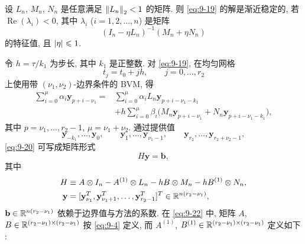 \begin{lemma}
\label{lem:9-3}
设 $L_n$, $M_n$, $N_n$ 是任意满足 $\left\|L_n\right\|_2<1$ 的矩阵. 则 \eqref{eq:9-19} 的解是渐近稳定的, 若 $\operatorname{Re}(\lambda_i)<0$, 其中 $\lambda_i$ ($i=1,2,\ldots,n$) 是矩阵
\[
  (I_n-\eta L_n)^{-1}(M_n+\eta N_n)
\]
的特征值, 且 $\left|\eta\right|\leqslant1$.
\end{lemma}

令 $h=\tau/k_1$ 为步长, 其中 $k_1$ 是正整数. 对 \eqref{eq:9-19}, 在均匀网格
\[
  t_j=t_0+jh,\qquad j=0,\ldots,r_2
\]
上使用带 $(\nu_1,\nu_2)$-边界条件的 BVM, 得
\begin{equation}
  \begin{aligned}
    \sum_{i=0}^{\mu}\alpha_i\mathbf{y}_{p+i-\nu_1}
    ={}&\sum_{i=0}^{\mu}\alpha_iL_n\mathbf{y}_{p+i-\nu_1-k_1}\\
    &+h\sum_{i=0}^{\mu}\beta_i\bigl(M_n\mathbf{y}_{p+i-\nu_1}
      +N_n\mathbf{y}_{p+i-\nu_1-k_1}\bigr),
  \end{aligned}
  \label{eq:9-20}
\end{equation}
其中 $p=\nu_1,\ldots,r_2-1$, $\mu=\nu_1+\nu_2$. 通过提供值
\begin{equation}
  \mathbf{y}_{-k_1},\ldots,\mathbf{y}_0,\qquad
  \mathbf{y}_1,\ldots,\mathbf{y}_{\nu_1-1},\qquad
  \mathbf{y}_{r_2},\ldots,\mathbf{y}_{r_2+\nu_2-1},
  \label{eq:9-21}
\end{equation}
\eqref{eq:9-20} 可写成矩阵形式
\[
  H\mathbf{y}=\mathbf{b},
\]
其中
\begin{equation}
  \begin{aligned}
    H&\equiv A\otimes I_n-A^{(1)}\otimes L_n-hB\otimes M_n
      -hB^{(1)}\otimes N_n,\\
    \mathbf{y}&=[\mathbf{y}_{\nu_1}^T,\mathbf{y}_{\nu_1+1}^T,\ldots,
      \mathbf{y}_{r_2-1}^T]^T\in\mathbb{R}^{n(r_2-\nu_1)},
  \end{aligned}
  \label{eq:9-22}
\end{equation}
$\mathbf{b}\in\mathbb{R}^{n(r_2-\nu_1)}$ 依赖于边界值与方法的系数. 在 \eqref{eq:9-22} 中, 矩阵 $A$, $B\in\mathbb{R}^{(r_2-\nu_1)\times(r_2-\nu_1)}$ 按 \eqref{eq:9-4} 定义, 而 $A^{(1)}$, $B^{(1)}\in\mathbb{R}^{(r_2-\nu_1)\times(r_2-\nu_1)}$ 定义如下 \cite{src:5}:
